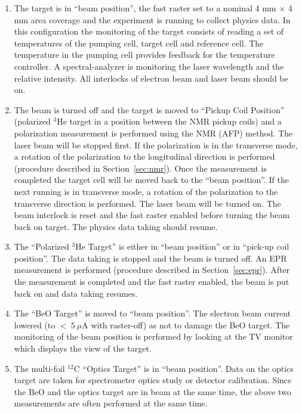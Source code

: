 \begin{safetyen}{10}{5}

\begin{enumerate}

\item 
The target is in ``beam position'', the fast raster set to a
nominal 4 mm $\times$ 4 mm area coverage and the experiment is
running to collect physics data. In this configuration the monitoring
of the target consists of reading a set of temperatures of the pumping
cell, target cell and reference cell. The temperature in the pumping
cell provides feedback for the temperature controller.  A spectral-analyzer
is monitoring the laser wavelength and the relative intensity.
All interlocks of electron beam and laser beam should be on.

\item 
The beam is turned off and the target is moved to ``Pickup Coil Position''
(polarized $^3$He target in a position
between the NMR pickup coils) and a polarization measurement is
performed using the NMR (AFP) method.  The laser beam will be stopped
first. If the polarization is in the transverse mode, 
a rotation of the polarization to the longitudinal direction is
performed (procedure described in Section~\ref{sec:nmr}).  Once the
measurement is completed the target cell will be moved back to the ``beam
position''. If the next running is in transverse mode, a rotation of
the polarization to the transverse direction is performed.
The laser beam will be turned on. The beam interlock is
reset and the fast raster enabled before turning the beam back on
target. The physics data taking should resume. 

\item 
The ``Polarized $^3$He Target'' is either in ``beam position'' or in ``pick-up
coil position''.  The data taking is stopped and the 
beam is turned off. An EPR measurement is performed (procedure described in 
Section~\ref{sec:epr}). After the measurement
is completed and the fast raster enabled, the beam is put back on and
data taking resumes.

\item 
The ``BeO Target'' is moved to ``beam position''.
The electron beam current lowered (to $<~5~\mu$A with raster-off) 
as not to damage the 
BeO target.  The monitoring of the beam
position is performed by looking at the TV monitor which displays the
view of the target.

\item 
The multi-foil $^{12}$C ``Optics Target'' is in ``beam position''. Data on the optics
target are taken for spectrometer optics study or detector calibration.
Since the BeO and the optics target are in beam at the same time, the above 
two measurements are often performed at the same time.


\end{enumerate}
\end{safetyen}
